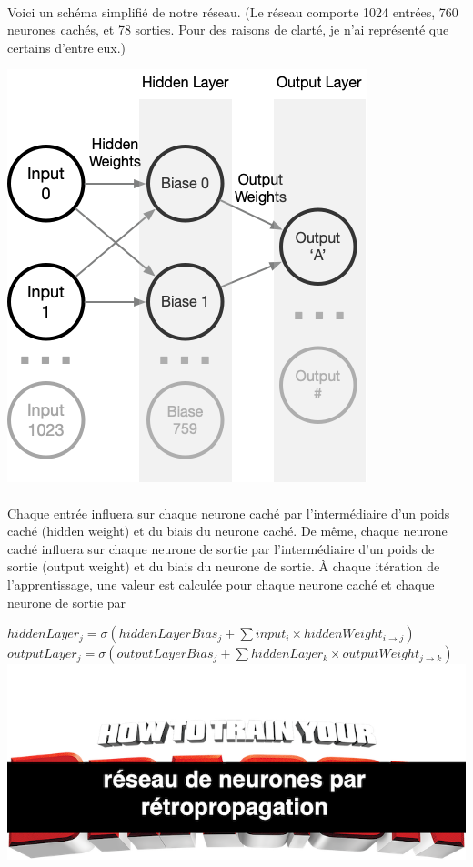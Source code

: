 \documentclass{article}
\begin{document}
\paragraph{}Voici un schéma simplifié de notre réseau.
(Le réseau comporte 1024 entrées, 760 neurones cachés, et 78 sorties. Pour des raisons de clarté, je n'ai représenté que certains d'entre eux.)

\begin{center}
	\includegraphics[scale=0.5]{Neuron}
\end{center}

\paragraph{}Chaque entrée influera sur chaque neurone caché par l'intermédiaire d'un poids caché (hidden weight) et du biais du neurone caché.
De même, chaque neurone caché influera sur chaque neurone de sortie par l'intermédiaire d'un poids de sortie (output weight) et du biais du neurone de sortie.
À chaque itération de l'apprentissage, une valeur est calculée pour chaque neurone caché et chaque neurone de sortie par

\begin{center}
	$hiddenLayer_j=\sigma(hiddenLayerBias_j+\sum input_i\times hiddenWeight_{i\rightarrow j})$
	\vspace*{0.3cm}
	$outputLayer_j=\sigma(outputLayerBias_j+\sum hiddenLayer_k\times outputWeight_{j\rightarrow k})$
	\includegraphics[scale=0.5]{Meme}
\end{center}
\end{document}
